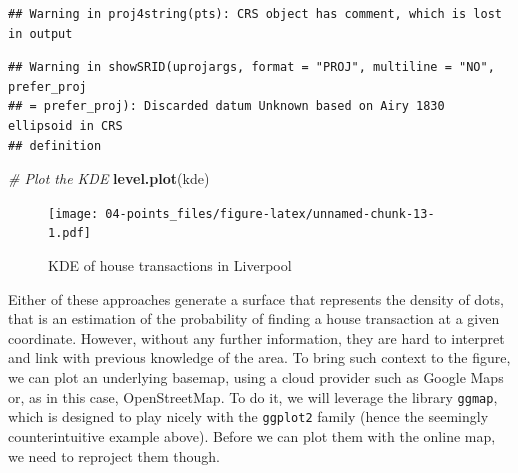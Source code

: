 \documentclass[
]{book}
\newenvironment{Shaded}{\begin{snugshade}}{\end{snugshade}}
\newcommand{\CommentTok}[1]{\textcolor[rgb]{0.56,0.35,0.01}{\textit{#1}}}
\newcommand{\KeywordTok}[1]{\textcolor[rgb]{0.13,0.29,0.53}{\textbf{#1}}}
\newcommand{\NormalTok}[1]{#1}
\begin{document}
\begin{verbatim}
## Warning in proj4string(pts): CRS object has comment, which is lost in output
\end{verbatim}

\begin{verbatim}
## Warning in showSRID(uprojargs, format = "PROJ", multiline = "NO", prefer_proj
## = prefer_proj): Discarded datum Unknown based on Airy 1830 ellipsoid in CRS
## definition
\end{verbatim}

\begin{Shaded}
\begin{Highlighting}[]
\CommentTok{# Plot the KDE}
\KeywordTok{level.plot}\NormalTok{(kde)}
\end{Highlighting}
\end{Shaded}

\begin{figure}
\centering
\texttt{[image: 04-points\_files/figure-latex/unnamed-chunk-13-1.pdf]}
\caption{\label{fig:unnamed-chunk-13}KDE of house transactions in Liverpool}
\end{figure}

Either of these approaches generate a surface that represents the density of dots, that is an estimation of the probability of finding a house transaction at a given coordinate. However, without any further information, they are hard to interpret and link with previous knowledge of the area. To bring such context to the figure, we can plot an underlying basemap, using a cloud provider such as Google Maps or, as in this case, OpenStreetMap. To do it, we will leverage the library \texttt{ggmap}, which is designed to play nicely with the \texttt{ggplot2} family (hence the seemingly counterintuitive example above). Before we can plot them with the online map, we need to reproject them though.
\end{document}

